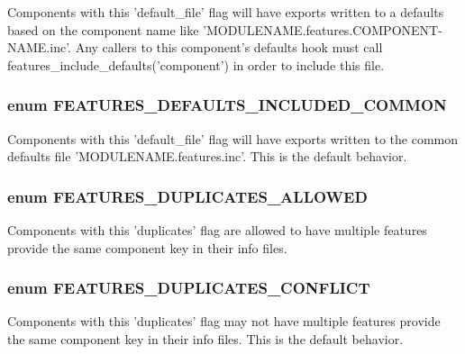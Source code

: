 \label{features_8module_a92c2163fbee04cf83502aa6b7f1c259d}
Components with this 'default\_\-file' flag will have exports written to a defaults based on the component name like 'MODULENAME.features.COMPONENT-\/NAME.inc'. Any callers to this component's defaults hook must call features\_\-include\_\-defaults('component') in order to include this file. \hypertarget{features_8module_a7eb1ad8581b51a16f6bf1644f647342e}{
\subsubsection[{FEATURES\_\-DEFAULTS\_\-INCLUDED\_\-COMMON}]{\setlength{\rightskip}{0pt plus 5cm}enum {\bf FEATURES\_\-DEFAULTS\_\-INCLUDED\_\-COMMON}}}
\label{features_8module_a7eb1ad8581b51a16f6bf1644f647342e}
Components with this 'default\_\-file' flag will have exports written to the common defaults file 'MODULENAME.features.inc'. This is the default behavior. \hypertarget{features_8module_a0a5a98e03aae74b4cdd0e28a2577361a}{
\subsubsection[{FEATURES\_\-DUPLICATES\_\-ALLOWED}]{\setlength{\rightskip}{0pt plus 5cm}enum {\bf FEATURES\_\-DUPLICATES\_\-ALLOWED}}}
\label{features_8module_a0a5a98e03aae74b4cdd0e28a2577361a}
Components with this 'duplicates' flag are allowed to have multiple features provide the same component key in their info files. \hypertarget{features_8module_a428c0bde0ed719decf70ed07ad640be8}{
\subsubsection[{FEATURES\_\-DUPLICATES\_\-CONFLICT}]{\setlength{\rightskip}{0pt plus 5cm}enum {\bf FEATURES\_\-DUPLICATES\_\-CONFLICT}}}
\label{features_8module_a428c0bde0ed719decf70ed07ad640be8}
Components with this 'duplicates' flag may not have multiple features provide the same component key in their info files. This is the default behavior. 

